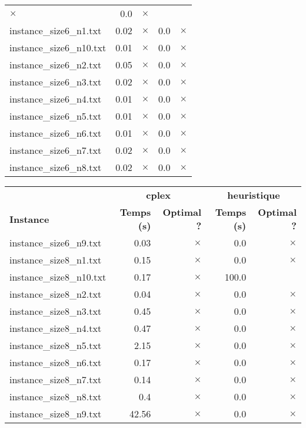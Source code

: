 \documentclass{article}
\begin{document}
\begin{center}
\begin{tabular}{lrrrr}
$\times$
 & 0.0 & 
$\times$
\\
instance\_size6\_n1.txt & 0.02 & 
$\times$
 & 0.0 & 
$\times$
\\
instance\_size6\_n10.txt & 0.01 & 
$\times$
 & 0.0 & 
$\times$
\\
instance\_size6\_n2.txt & 0.05 & 
$\times$
 & 0.0 & 
$\times$
\\
instance\_size6\_n3.txt & 0.02 & 
$\times$
 & 0.0 & 
$\times$
\\
instance\_size6\_n4.txt & 0.01 & 
$\times$
 & 0.0 & 
$\times$
\\
instance\_size6\_n5.txt & 0.01 & 
$\times$
 & 0.0 & 
$\times$
\\
instance\_size6\_n6.txt & 0.01 & 
$\times$
 & 0.0 & 
$\times$
\\
instance\_size6\_n7.txt & 0.02 & 
$\times$
 & 0.0 & 
$\times$
\\
instance\_size6\_n8.txt & 0.02 & 
$\times$
 & 0.0 & 
$\times$
\\
\hline\end{tabular}
\end{center}

\newpage
\begin{center}
\renewcommand{\arraystretch}{1.4}
 \begin{tabular}{lrrrr}
	\hline
 & \multicolumn{2}{c}{\textbf{cplex}} & \multicolumn{2}{c}{\textbf{heuristique}}\\
\textbf{Instance}  & \textbf{Temps (s)} & \textbf{Optimal ?}  & \textbf{Temps (s)} & \textbf{Optimal ?} \\\hline

instance\_size6\_n9.txt & 0.03 & 
$\times$
 & 0.0 & 
$\times$
\\
instance\_size8\_n1.txt & 0.15 & 
$\times$
 & 0.0 & 
$\times$
\\
instance\_size8\_n10.txt & 0.17 & 
$\times$
 & 100.0 & 
\\
instance\_size8\_n2.txt & 0.04 & 
$\times$
 & 0.0 & 
$\times$
\\
instance\_size8\_n3.txt & 0.45 & 
$\times$
 & 0.0 & 
$\times$
\\
instance\_size8\_n4.txt & 0.47 & 
$\times$
 & 0.0 & 
$\times$
\\
instance\_size8\_n5.txt & 2.15 & 
$\times$
 & 0.0 & 
$\times$
\\
instance\_size8\_n6.txt & 0.17 & 
$\times$
 & 0.0 & 
$\times$
\\
instance\_size8\_n7.txt & 0.14 & 
$\times$
 & 0.0 & 
$\times$
\\
instance\_size8\_n8.txt & 0.4 & 
$\times$
 & 0.0 & 
$\times$
\\
instance\_size8\_n9.txt & 42.56 & 
$\times$
 & 0.0 & 
$\times$
\\
\hline\end{tabular}
\end{center}
\end{document}
